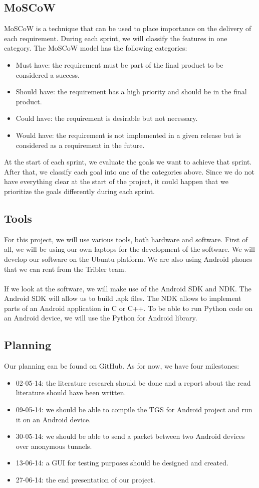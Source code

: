 \subsection{MoSCoW}
MoSCoW is a technique that can be used to place importance on the delivery of each requirement. During each sprint, we will classify the features in one category. The MoSCoW model has the following categories:
\begin{itemize}
\item Must have: the requirement must be part of the final product to be considered a success.
\item Should have: the requirement has a high priority and should be in the final product.
\item Could have: the requirement is desirable but not necessary.
\item Would have: the requirement is not implemented in a given release but is considered as a requirement in the future.
\end{itemize}
At the start of each sprint, we evaluate the goals we want to achieve that sprint. After that, we classify each goal into one of the categories above. Since we do not have everything clear at the start of the project, it could happen that we prioritize the goals differently during each sprint.

\subsection{Tools}
For this project, we will use various tools, both hardware and software. First of all, we will be using our own laptops for the development of the software. We will develop our software on the Ubuntu platform. We are also using Android phones that we can rent from the Tribler team.\\\\
If we look at the software, we will make use of the Android SDK and NDK. The Android SDK will allow us to build .apk files. The NDK allows to implement parts of an Android application in C or C++. To be able to run Python code on an Android device, we will use the Python for Android library.

\subsection{Planning}
Our planning can be found on GitHub. As for now, we have four milestones:
\begin{itemize}
\item 02-05-14: the literature research should be done and a report about the read literature should have been written.
\item 09-05-14: we should be able to compile the TGS for Android project and run it on an Android device.
\item 30-05-14: we should be able to send a packet between two Android devices over anonymous tunnels.
\item 13-06-14: a GUI for testing purposes should be designed and created.
\item 27-06-14: the end presentation of our project.
\end{itemize}

